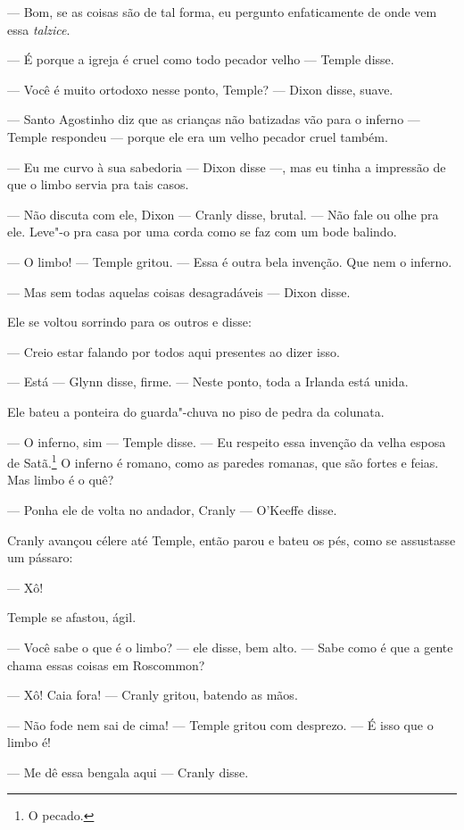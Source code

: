  --- Bom, se as coisas são de tal forma,
eu pergunto enfaticamente de onde vem essa \textit{talzice}.

 --- É porque a igreja é cruel como todo pecador velho --- Temple disse.

 --- Você é muito ortodoxo nesse ponto, Temple? --- Dixon disse, suave.

 --- Santo Agostinho diz que as crianças não batizadas vão para o inferno --- 
 Temple respondeu --- porque ele era um velho pecador cruel também.

 --- Eu me curvo à sua sabedoria --- Dixon disse ---, mas eu tinha a impressão de
que o limbo servia pra tais casos.

 --- Não discuta com ele, Dixon --- Cranly disse, brutal. --- Não fale ou olhe pra
ele. Leve"-o pra casa por uma corda como se faz com um bode balindo.

 --- O limbo! --- Temple gritou. --- Essa é outra bela invenção. Que nem o inferno.

 --- Mas sem todas aquelas coisas desagradáveis --- Dixon disse.

Ele se voltou sorrindo para os outros e disse:

 --- Creio estar falando por todos aqui presentes ao dizer isso.

 --- Está --- Glynn disse, firme. --- Neste ponto, toda a Irlanda está unida.

Ele bateu a ponteira do guarda"-chuva no piso de pedra da colunata.

 --- O inferno, sim --- Temple disse. --- Eu respeito essa invenção da velha
esposa de Satã.\footnote{ O pecado.} O inferno é romano, como as
paredes romanas, que são fortes e feias. Mas limbo é o quê?

 --- Ponha ele de volta no andador, Cranly --- O’Keeffe disse.

Cranly avançou célere até Temple, então parou e bateu os pés, como se
assustasse um pássaro:

 --- Xô!

Temple se afastou, ágil.

 --- Você sabe o que é o limbo? --- ele disse, bem alto. --- Sabe como é que a
gente chama essas coisas em Roscommon?

 --- Xô! Caia fora! --- Cranly gritou, batendo as mãos.

 --- Não fode nem sai de cima! --- Temple gritou com desprezo. --- É isso que o limbo é!

 --- Me dê essa bengala aqui --- Cranly disse.

